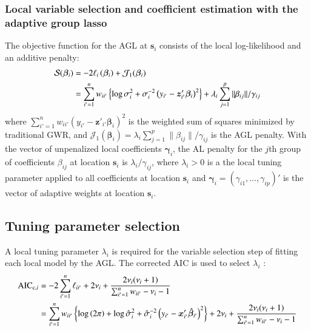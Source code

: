 \documentclass[authoryear, review, 11pt]{elsarticle}
\begin{document}
	\subsubsection{Local variable selection and coefficient estimation with the adaptive group lasso}
	The objective function for the AGL at $\bm{s}_i$ consists of the local log-likelihood and an additive penalty:%
	\begin{align}\label{eq:adaptive-lasso-WLS}
		\mathcal{S}(\bm{\beta}_i) &= -2\ell_i\left(\bm{\beta}_i\right) + \mathcal{J}_1(\bm{\beta}_i) \notag \\
		&= \sum_{i'=1}^n w_{ii'}  \left\{ \log{\sigma^2_i}  + \sigma^{-2}_i  \left(y_{i'} - \bm{z}'_{i'} \bm{\beta}_i \right)^2 \right\} +  \lambda_i \sum_{j=1}^p \|\beta_{ij}\| / \gamma_{ij}
	\end{align}
	where $\sum_{i'=1}^n w_{ii'} \left(y_{i'} - \bm{z}'_{i'} \bm{\beta}_i \right)^2$ is the weighted sum of squares minimized by traditional GWR, and $\mathcal{J}_1(\bm{\beta}_i) = \lambda_i \sum_{j=1}^p \|\beta_{ij}\| / \gamma_{ij}$ is the AGL penalty. With the vector of unpenalized local coefficients $\bm{\gamma}_i$, the AL penalty for the $j$th group of coefficients $\beta_{ij}$ at location $\bm{s}_i$ is $\lambda_i / \gamma_{ij}$, where $\lambda_i > 0$ is a the local tuning parameter applied to all coefficients at location $\bm{s}_i$ and $\bm{\gamma}_i = \left(\gamma_{i1}, \dots, \gamma_{ip}\right)'$ is the vector of adaptive weights at location $\bm{s}_i$.

	\subsection{Tuning parameter selection}	
	A local tuning parameter $\lambda_i$ is required for the variable selection step of fitting each local model by the AGL. The corrected AIC is used to select $\lambda_i$ \citep{Hurvich:1998}:
	\begin{align}\label{eq:BIC_loc}
		\mbox{AIC}_{\text{c}, i} &= -2 \sum_{i'=1}^n \ell_{ii'}  + 2 \nu_i + \frac{2 \nu_i (\nu_i + 1)}{\sum_{i'=1}^n w_{ii'}  -\nu_i - 1}\notag\\
		&= \sum_{i'=1}^n w_{ii'} \left\{ \log \left(2 \pi \right) + \log \hat{\sigma}_i^2 + \hat{\sigma}_i^{-2} \left(y_{i'} - \bm{x}_{i'}' \hat{\bm{\beta}}_{i'} \right)^2 \right\} + 2 \nu_i + \frac{2 \nu_i (\nu_i + 1)}{\sum_{i'=1}^n w_{ii'}  -\nu_i - 1}
	\end{align}
	
\end{document}
